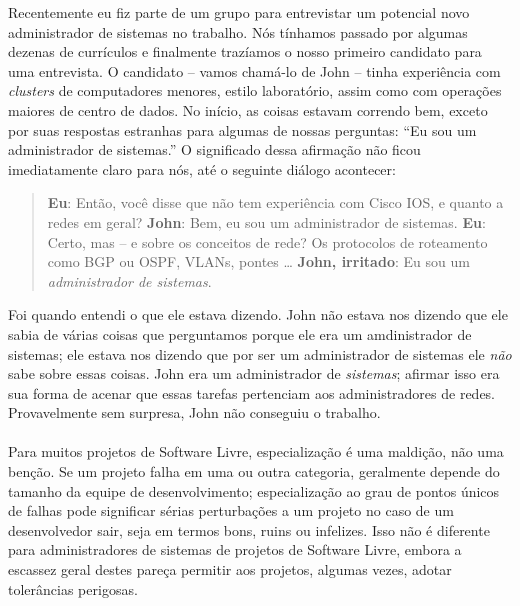 

\noindent{}Recentemente eu fiz parte de um grupo para entrevistar um potencial
novo administrador de sistemas no trabalho. Nós tínhamos passado por algumas
dezenas de currículos e finalmente trazíamos o nosso primeiro candidato para
uma entrevista. O candidato -- vamos chamá-lo de John -- tinha experiência
com \textit{clusters} de computadores menores, estilo laboratório, assim como
com operações maiores de centro de dados. No início, as coisas estavam correndo
bem, exceto por suas respostas estranhas para algumas de nossas perguntas: ``Eu
sou um administrador de sistemas.'' O significado dessa afirmação não ficou
imediatamente claro para nós, até o seguinte diálogo acontecer:
\begin{quote}
\textbf{Eu}: Então, você disse que não tem experiência com Cisco IOS,
e quanto a redes em geral?\newline
\textbf{John}: Bem, eu sou um administrador de sistemas.\newline
\textbf{Eu}: Certo, mas -- e sobre os conceitos de rede? Os protocolos
de roteamento como BGP ou OSPF, VLANs, pontes \dots \newline
\textbf{John, irritado}: Eu sou um \emph{administrador de sistemas}.
\end{quote}
Foi quando entendi o que ele estava dizendo. John não estava nos dizendo
que ele sabia de várias coisas que perguntamos porque ele era um amdinistrador
de sistemas; ele estava nos dizendo que por ser um administrador de sistemas
ele \emph{não} sabe sobre essas coisas. John era um administrador de \emph{sistemas};
afirmar isso era sua forma de acenar que essas tarefas pertenciam aos administradores
de redes. Provavelmente sem surpresa, John não conseguiu o trabalho. 

\paragraph*{}Para muitos projetos de Software Livre, especialização é uma maldição,
não uma benção. Se um projeto falha em uma ou outra categoria, geralmente depende
do tamanho da equipe de desenvolvimento; especialização ao grau de pontos únicos de
falhas pode significar sérias perturbações a um projeto no caso de um desenvolvedor
sair, seja em termos bons, ruins ou infelizes. Isso não é diferente para administradores
de sistemas de projetos de Software Livre, embora a escassez geral destes pareça permitir
aos projetos, algumas vezes, adotar tolerâncias perigosas.

